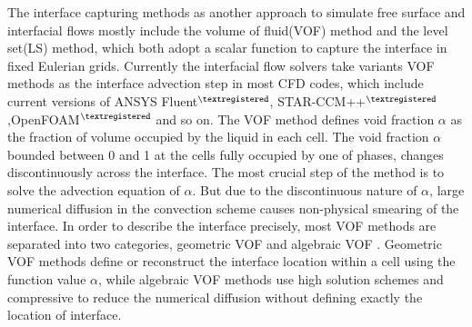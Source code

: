The interface capturing methods as another approach to simulate free surface and interfacial flows mostly include the volume of fluid(VOF) method\cite{hirt1981volume,rudman1997volume} and the level set(LS) method\cite{Sussman1994A,chang1996level}, which both adopt a scalar function to capture the interface in fixed Eulerian grids. Currently the interfacial flow solvers take variants VOF methods as the interface advection step in most CFD codes, which include current versions of ANSYS Fluent$^{\textregistered}$, STAR-CCM++$^{\textregistered}$,OpenFOAM$^{\textregistered}$ and so on. The VOF method defines void fraction $\alpha$ as the fraction of volume occupied by the liquid in each cell. The void fraction $\alpha$ bounded between 0 and 1 at the cells fully occupied by one of phases, changes discontinuously across the interface. The most crucial step of the method is to solve the advection equation of $\alpha$. But due to the discontinuous nature of $\alpha$, large numerical diffusion in the convection scheme causes non-physical smearing of the interface. In order to describe the interface precisely, most VOF methods are separated into two categories, geometric VOF \cite{diot2016interface,hirt1981volume,Gueyffier1999Volume,NohAndWoodward1976,RIDER1998112,Youngs1982,roenby2016computational,puckett1997high} and algebraic VOF \cite{rudman1997volume,Muzaferijia1998,Ubbink1997,weller2008new,rusche2003computational,deshpande2012evaluating}. Geometric VOF methods define or reconstruct the interface location within a cell using the function value $\alpha$, while algebraic VOF methods use high solution schemes and compressive to reduce the numerical diffusion without defining exactly the location of interface.

